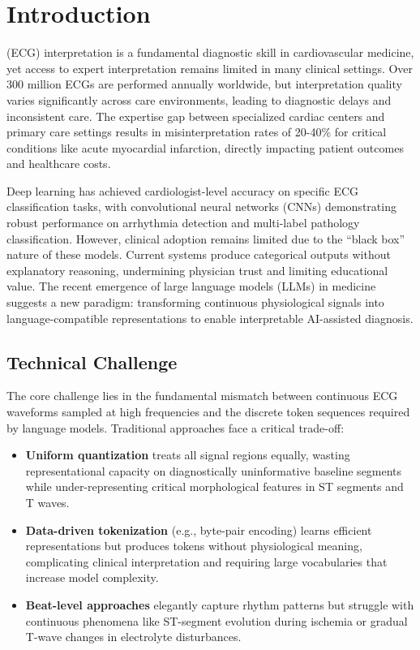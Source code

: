 \documentclass[journal]{IEEEtran}
\begin{document}
\section{Introduction}
 (ECG) interpretation is a fundamental diagnostic skill in cardiovascular medicine, yet access to expert interpretation remains limited in many clinical settings. Over 300 million ECGs are performed annually worldwide, but interpretation quality varies significantly across care environments, leading to diagnostic delays and inconsistent care. The expertise gap between specialized cardiac centers and primary care settings results in misinterpretation rates of 20-40\% for critical conditions like acute myocardial infarction, directly impacting patient outcomes and healthcare costs.

Deep learning has achieved cardiologist-level accuracy on specific ECG classification tasks, with convolutional neural networks (CNNs) demonstrating robust performance on arrhythmia detection and multi-label pathology classification. However, clinical adoption remains limited due to the ``black box'' nature of these models. Current systems produce categorical outputs without explanatory reasoning, undermining physician trust and limiting educational value. The recent emergence of large language models (LLMs) in medicine suggests a new paradigm: transforming continuous physiological signals into language-compatible representations to enable interpretable AI-assisted diagnosis.

\subsection{Technical Challenge}

The core challenge lies in the fundamental mismatch between continuous ECG waveforms sampled at high frequencies and the discrete token sequences required by language models. Traditional approaches face a critical trade-off:

\begin{itemize}
\item \textbf{Uniform quantization} treats all signal regions equally, wasting representational capacity on diagnostically uninformative baseline segments while under-representing critical morphological features in ST segments and T waves.

\item \textbf{Data-driven tokenization} (e.g., byte-pair encoding) learns efficient representations but produces tokens without physiological meaning, complicating clinical interpretation and requiring large vocabularies that increase model complexity.

\item \textbf{Beat-level approaches} elegantly capture rhythm patterns but struggle with continuous phenomena like ST-segment evolution during ischemia or gradual T-wave changes in electrolyte disturbances.
\end{itemize}
\end{document}
